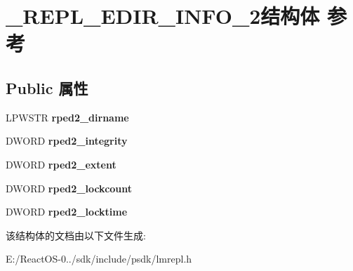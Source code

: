 \hypertarget{struct___r_e_p_l___e_d_i_r___i_n_f_o__2}{}\section{\+\_\+\+R\+E\+P\+L\+\_\+\+E\+D\+I\+R\+\_\+\+I\+N\+F\+O\+\_\+2结构体 参考}
\label{struct___r_e_p_l___e_d_i_r___i_n_f_o__2}
\subsection*{Public 属性}
\begin{DoxyCompactItemize}
\item 
\mbox{\label{struct___r_e_p_l___e_d_i_r___i_n_f_o__2_a4c95d9f92f866d6cb6221b5f77e0b9d8}} 
L\+P\+W\+S\+TR {\bfseries rped2\+\_\+dirname}
\item 
\mbox{\label{struct___r_e_p_l___e_d_i_r___i_n_f_o__2_a8e393ef368adc2b10c50e14bb60c971d}} 
D\+W\+O\+RD {\bfseries rped2\+\_\+integrity}
\item 
\mbox{\label{struct___r_e_p_l___e_d_i_r___i_n_f_o__2_a7b87d9db9446ba92ded0ddf5447af28c}} 
D\+W\+O\+RD {\bfseries rped2\+\_\+extent}
\item 
\mbox{\label{struct___r_e_p_l___e_d_i_r___i_n_f_o__2_a3e9cc6d8425fc7c315d9a810804930c3}} 
D\+W\+O\+RD {\bfseries rped2\+\_\+lockcount}
\item 
\mbox{\label{struct___r_e_p_l___e_d_i_r___i_n_f_o__2_ad4705b2c78cca0cab77932bc3441ff68}} 
D\+W\+O\+RD {\bfseries rped2\+\_\+locktime}
\end{DoxyCompactItemize}


该结构体的文档由以下文件生成\+:\begin{DoxyCompactItemize}
\item 
E\+:/\+React\+O\+S-\/0../sdk/include/psdk/lmrepl.\+h\end{DoxyCompactItemize}

